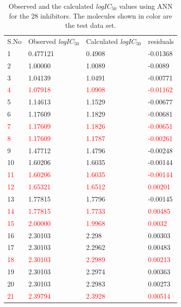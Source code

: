 \documentclass[twocolumn]{article}
\begin{document}
\begin{table}[htb]
  \caption{Observed and the calculated {\it log}$IC_{50}$ values using ANN for the 28
inhibitors. The molecules shown in color are the test data set.}
\label{tab:table2}
\begin{tabular}{llll}
\hline\noalign{\smallskip}
S.No & Observed {\it log}$IC_{50}$ & Calculated {\it log}$IC_{50}$ & residuals  \\
\noalign{\smallskip}\hline\noalign{\smallskip}
1 & 0.477121 & 0.4908 & -0.01368\\
2 &  1.00000 & 1.0089 & -0.0089\\
3 &  1.04139 & 1.0491 & -0.00771\\
\textcolor{red}{4} & \textcolor{red}{1.07918} & \textcolor{red}{1.0908} &
\textcolor{red}{-0.01162}\\
5 & 1.14613 & 1.1529 & -0.00677\\
6 & 1.17609 & 1.1829 & -0.00681\\
\textcolor{red}{7} & \textcolor{red}{1.17609} & \textcolor{red}{1.1826} &
\textcolor{red}{-0.00651}\\
\textcolor{red}{8} & \textcolor{red}{1.17609} & \textcolor{red}{1.1787} &
\textcolor{red}{-0.00261}\\
9 & 1.47712 & 1.4796 & -0.00248\\
10 & 1.60206 & 1.6035 & -0.00144\\
\textcolor{red}{11} & \textcolor{red}{1.60206} & \textcolor{red}{1.6035} &
\textcolor{red}{-0.00144}\\
\textcolor{red}{12} & \textcolor{red}{1.65321} & \textcolor{red}{1.6512} &
\textcolor{red}{0.00201}\\
13 & 1.77815 & 1.7796 & -0.00145\\
\textcolor{red}{14} & \textcolor{red}{1.77815} & \textcolor{red}{1.7733} &
\textcolor{red}{0.00485}\\
\textcolor{red}{15} & \textcolor{red}{2.00000} & \textcolor{red}{1.9968} &
\textcolor{red}{0.0032}\\
16 & 2.30103 & 2.298 & 0.00303\\
17 & 2.30103 & 2.2962 & 0.00483\\
\textcolor{red}{18} & \textcolor{red}{2.30103} & \textcolor{red}{2.2989} &
\textcolor{red}{0.00213}\\
19 & 2.30103 & 2.2974 & 0.00363\\
20 & 2.30103 & 2.2983 & 0.00273\\
\textcolor{red}{21} & \textcolor{red}{2.39794} & \textcolor{red}{2.3928} &
\textcolor{red}{0.00514}\\

\end{tabular}
\end{table}
\end{document}
